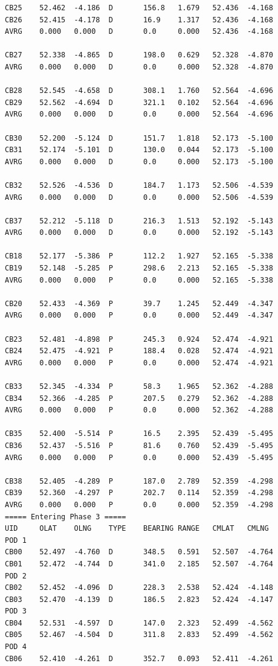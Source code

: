 \documentclass[10pt]{article}
\begin{document}
\begin{verbatim}
CB25    52.462  -4.186  D       156.8   1.679   52.436  -4.168
CB26    52.415  -4.178  D       16.9    1.317   52.436  -4.168
AVRG    0.000   0.000   D       0.0     0.000   52.436  -4.168

CB27    52.338  -4.865  D       198.0   0.629   52.328  -4.870
AVRG    0.000   0.000   D       0.0     0.000   52.328  -4.870

CB28    52.545  -4.658  D       308.1   1.760   52.564  -4.696
CB29    52.562  -4.694  D       321.1   0.102   52.564  -4.696
AVRG    0.000   0.000   D       0.0     0.000   52.564  -4.696

CB30    52.200  -5.124  D       151.7   1.818   52.173  -5.100
CB31    52.174  -5.101  D       130.0   0.044   52.173  -5.100
AVRG    0.000   0.000   D       0.0     0.000   52.173  -5.100

CB32    52.526  -4.536  D       184.7   1.173   52.506  -4.539
AVRG    0.000   0.000   D       0.0     0.000   52.506  -4.539

CB37    52.212  -5.118  D       216.3   1.513   52.192  -5.143
AVRG    0.000   0.000   D       0.0     0.000   52.192  -5.143

CB18    52.177  -5.386  P       112.2   1.927   52.165  -5.338
CB19    52.148  -5.285  P       298.6   2.213   52.165  -5.338
AVRG    0.000   0.000   P       0.0     0.000   52.165  -5.338

CB20    52.433  -4.369  P       39.7    1.245   52.449  -4.347
AVRG    0.000   0.000   P       0.0     0.000   52.449  -4.347

CB23    52.481  -4.898  P       245.3   0.924   52.474  -4.921
CB24    52.475  -4.921  P       188.4   0.028   52.474  -4.921
AVRG    0.000   0.000   P       0.0     0.000   52.474  -4.921

CB33    52.345  -4.334  P       58.3    1.965   52.362  -4.288
CB34    52.366  -4.285  P       207.5   0.279   52.362  -4.288
AVRG    0.000   0.000   P       0.0     0.000   52.362  -4.288

CB35    52.400  -5.514  P       16.5    2.395   52.439  -5.495
CB36    52.437  -5.516  P       81.6    0.760   52.439  -5.495
AVRG    0.000   0.000   P       0.0     0.000   52.439  -5.495

CB38    52.405  -4.289  P       187.0   2.789   52.359  -4.298
CB39    52.360  -4.297  P       202.7   0.114   52.359  -4.298
AVRG    0.000   0.000   P       0.0     0.000   52.359  -4.298
===== Entering Phase 3 =====
UID     OLAT    OLNG    TYPE    BEARING RANGE   CMLAT   CMLNG
POD 1
CB00    52.497  -4.760  D       348.5   0.591   52.507  -4.764
CB01    52.472  -4.744  D       341.0   2.185   52.507  -4.764
POD 2
CB02    52.452  -4.096  D       228.3   2.538   52.424  -4.148
CB03    52.470  -4.139  D       186.5   2.823   52.424  -4.147
POD 3
CB04    52.531  -4.597  D       147.0   2.323   52.499  -4.562
CB05    52.467  -4.504  D       311.8   2.833   52.499  -4.562
POD 4
CB06    52.410  -4.261  D       352.7   0.093   52.411  -4.261


\end{verbatim}
\end{document}

